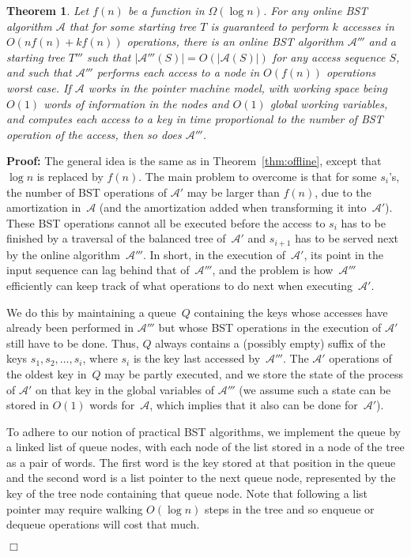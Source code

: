 \documentclass[11pt]{article}
\newtheorem{theorem}{Theorem}
\newenvironment{proof}{\noindent\textbf{Proof: }\ignorespaces}
  {\hspace*{\fill}$\Box$\medskip}
\def\A{{\mathcal{A}}}
\begin{document}
\begin{theorem}\label{thm:online}
Let $f(n)$ be a function in $\Omega(\log n)$. For any online BST algorithm
$\A$ that for some starting tree $T$ is guaranteed to perform $k$ accesses
in $O(n f(n) + k f(n))$ operations, there is an online BST algorithm
$\A'''$ and a starting tree $T'''$ such that $|\A'''(S)| = O(|\A(S)|)$ for
any access sequence $S$, and such that $\A'''$ performs each access to a
node in $O(f(n))$ operations worst case.
If $\A$ works in the pointer machine model, with working space being $O(1)$
words of information in the nodes and $O(1)$ global working variables, and
computes each access to a key in time proportional to the number of BST
operation of the access, then so does $\A'''$.
\end{theorem}
\begin{proof}
The general idea is the same as in Theorem~\ref{thm:offline}, except
that $\log n$ is replaced by $f(n)$.
The main problem to overcome is that for some $s_i$'s, the number of BST
operations of $\A'$ may be larger than $f(n)$, due to the amortization
in~$\A$ (and the amortization added when transforming it into~$\A'$). These
BST operations cannot all be executed before the access to $s_i$ has to be
finished by a traversal of the balanced tree of~$\A'$ and $s_{i+1}$ has to
be served next by the online algorithm~$\A'''$. In short, in the execution
of~$\A'$, its point in the input sequence can lag behind that of~$\A'''$,
and the problem is how~$\A'''$ efficiently can keep track of what
operations to do next when executing~$\A'$.

We do this by maintaining a queue~$Q$ containing the keys whose accesses
have already been performed in $\A'''$ but whose BST operations in the
execution of $\A'$ still have to be done. Thus, $Q$ always contains a
(possibly empty) suffix of the keys $s_1,s_2,\dots,s_i$, where $s_i$ is the
key last accessed by~$\A'''$. The $\A'$ operations of the oldest key in~$Q$
may be partly executed, and we store the state of the process of $\A'$ on
that key in the global variables of $\A'''$ (we assume such a state can be
stored in $O(1)$ words for~$\A$, which implies that it also can be done
for~$\A'$).

To adhere to our notion of practical BST algorithms, we implement the
queue by a linked list of queue nodes, with each node of the list stored in a node of
the tree as a pair of words. The first word is the key stored at that
position in the queue and the second word is a list pointer to the next
queue node, represented by the key of the tree node containing
that queue node.  Note that following a list pointer may require walking
$O(\log n)$ steps in the tree and so enqueue or dequeue operations will
cost that much.


\end{proof}
\end{document}
